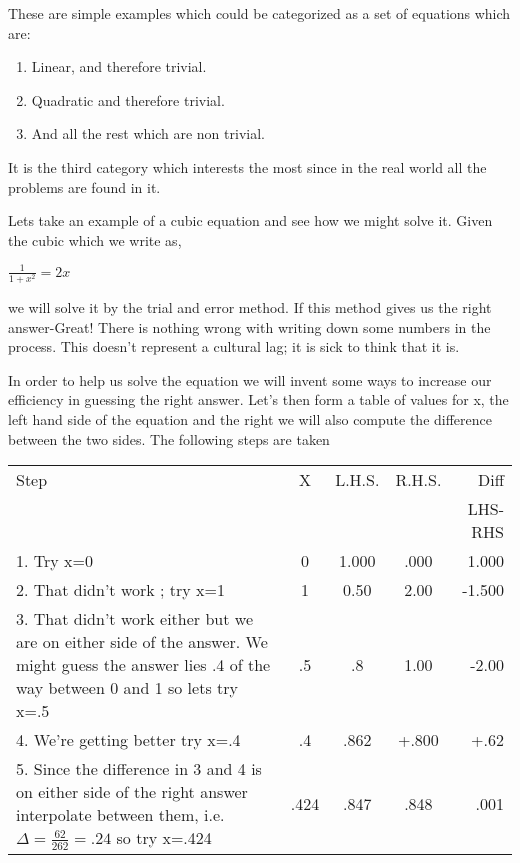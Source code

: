 \documentclass[a4paper,10pt]{article}
\begin{document}
These are simple examples which could be categorized as a set of equations which are:
\begin{enumerate}
 \item Linear, and therefore trivial.
\item Quadratic and therefore trivial. 
\item And all the rest which are non trivial.
\end{enumerate}

It is the third category which interests the most since in the real world all the problems are found in it.

Lets take an example of a cubic equation and see how we might solve it.  Given the cubic which we write as,

\begin{center}$\frac{1}{1+x^2}=2x$
\end{center}
we will solve it by the trial and error method.  If this method gives us the right answer-Great! There is nothing
wrong with writing down some numbers in the process. This doesn't represent a cultural lag; it is sick to think that
it is. 

In order to help us solve the equation we will invent some ways to increase our efficiency in guessing the right answer.
Let's then form a table of values for x, the left hand side of the equation and the right we will also compute the difference
between the two sides. The following steps are taken
\begin{center}
\begin{tabular}{p{5cm} c c c r}
 \centering Step & X & L.H.S. & R.H.S. & Diff\\
 & & & & {\small LHS-RHS}\\

1. Try x=0 & 0 & 1.000 & .000 & 1.000\\
2. That didn't work ; try x=1 & 1 & 0.50 & 2.00 & -1.500\\
3. That didn't work either but we are on either side of the answer. We might guess the answer
lies .4 of the way between 0 and 1 so lets try x=.5 & .5 & .8 & 1.00 & -2.00\\
4. We're getting better try x=.4 & .4 & .862 & +.800 & +.62\\
5. Since the difference in 3 and 4 is on either side of the right answer interpolate between them, i.e. $\Delta=\frac{62}{262}
=.24$ so try x=.424 & .424 & .847 & .848 &.001
\end{tabular}
\end{center}
\end{document}
